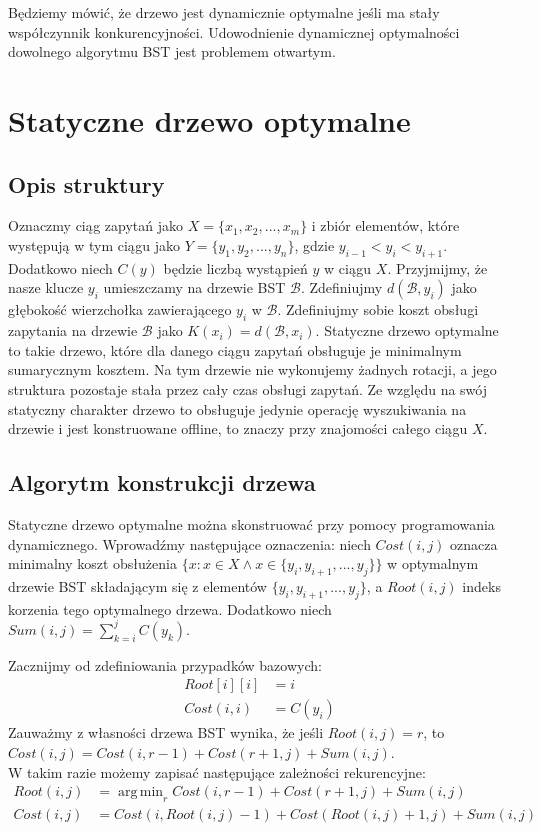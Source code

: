 \documentclass[declaration,shortabstract]{iithesis}
\DeclareMathOperator*{\argmin}{arg\,min}
\theoremstyle{thm}
\theoremstyle{remark}
\theoremstyle{plain}
\theoremstyle{plain}
\theoremstyle{plain}
\begin{document}
Będziemy mówić, że drzewo jest dynamicznie optymalne jeśli ma stały współczynnik konkurencyjności. Udowodnienie dynamicznej optymalności dowolnego algorytmu BST jest problemem otwartym.   

\chapter{Statyczne drzewo optymalne}

\section{Opis struktury}

Oznaczmy ciąg zapytań jako \( X = \{x_1, x_2, ..., x_m\}\) i zbiór elementów, które występują w tym ciągu jako \( Y = \{y_1, y_2, ..., y_n\}\), gdzie \(y_{i-1} < y_i < y_{i+1}\). 
Dodatkowo niech \(C(y)\) będzie liczbą wystąpień \(y\) w ciągu \(X\). 
Przyjmijmy, że nasze klucze \(y_i\) umieszczamy na drzewie BST \(\mathcal{B}\). Zdefiniujmy \( d(\mathcal{B}, y_i)\) jako głębokość wierzchołka zawierającego \(y_i\) w \(\mathcal{B}\). 
Zdefiniujmy sobie koszt obsługi zapytania na drzewie \(\mathcal{B}\) jako \(K(x_i) = d(\mathcal{B}, x_i)\).
Statyczne drzewo optymalne to takie drzewo, które dla danego ciągu zapytań obsługuje je minimalnym sumarycznym kosztem. 
Na tym drzewie nie wykonujemy żadnych rotacji, a jego struktura pozostaje stała przez cały czas obsługi zapytań. 
Ze względu na swój statyczny charakter drzewo to obsługuje jedynie operację wyszukiwania na drzewie i jest konstruowane offline, to znaczy przy znajomości całego ciągu $X$.

\section{Algorytm konstrukcji drzewa} \label{static_desc}

Statyczne drzewo optymalne można skonstruować przy pomocy programowania dynamicznego. Wprowadźmy następujące oznaczenia: niech \(Cost(i, j)\) oznacza minimalny koszt obsłużenia \(\{ x : x\in X \wedge x\in \{y_i, y_{i+1}, ..., y_{j}\}\}\) w optymalnym drzewie BST składającym się z elementów \(\{y_i, y_{i+1}, ..., y_{j}\}\), a \(Root(i, j)\) indeks korzenia tego optymalnego drzewa. Dodatkowo niech \(Sum(i, j) = \sum_{k = i}^j C(y_k)\).

Zacznijmy od zdefiniowania przypadków bazowych: 
\begin{align*}
Root[i][i] &= i\\
Cost(i, i) &= C(y_i)
\end{align*}
Zauważmy z własności drzewa BST wynika, że jeśli \(Root(i, j) = r\), to \(Cost(i, j) =  Cost(i, r-1) + Cost(r+1, j) + Sum(i, j)\).\\
W takim razie możemy zapisać następujące zależności rekurencyjne:
\begin{align*}
Root(i, j) &= \argmin_r Cost(i, r-1) + Cost(r+1, j) + Sum(i, j)\\
Cost(i, j) &=  Cost(i, Root(i, j)-1) + Cost(Root(i, j)+1, j) + Sum(i, j)\\
\end{align*}
\end{document}
